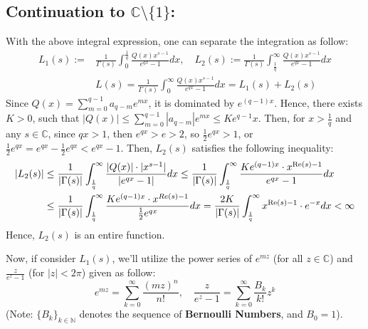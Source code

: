 \documentclass{article}
\newcommand{\NN}{\mathbb{N}}
\newcommand{\CC}{\mathbb{C}}
\newcommand{\Real}{\textmd{Re}}
\begin{document}
\subsection{Continuation to $\mathbb{C}\setminus\{1\}$:}
With the above integral expression, one can separate the integration as follow:
\begin{equation}
    \label{eq:6}
    \begin{split}
        L_1(s):=&\frac{1}{\Gamma(s)}\int_{0}^{\frac{1}{q}}\frac{Q(x)x^{s-1}}{e^{qx}-1}dx,\quad L_2(s):=\frac{1}{\Gamma(s)}\int_{\frac{1}{q}}^{\infty}\frac{Q(x)x^{s-1}}{e^{qx}-1}dx\\
        &L(s) = \frac{1}{\Gamma(s)}\int_{0}^{\infty}\frac{Q(x)x^{s-1}}{e^{qx}-1}dx = L_1(s)+L_2(s)
    \end{split}
\end{equation}
Since $Q(x)=\sum_{m=0}^{q-1}a_{q-m}e^{mx}$, it is dominated by $e^{(q-1)x}$. Hence, there exists $K>0$, such that $|Q(x)|\leq \sum_{m=0}^{q-1}|a_{q-m}|e^{mx}\leq Ke^{q-1}x$. Then, for $x>\frac{1}{q}$ and any $s\in\mathbb{C}$, since $qx >1$, then $e^{qx}>e>2$, so $\frac{1}{2}e^{qx}>1$, or $\frac{1}{2}e^{qx}=e^{qx}-\frac{1}{2}e^{qx}<e^{qx}-1$. Then, $L_2(s)$ satisfies the following inequality:
\begin{equation}
    \label{eq:7}
    \begin{split}
        |L_2(s)|&\leq \frac{1}{|\Gamma(s)|}\int_{\frac{1}{q}}^{\infty}\frac{|Q(x)|\cdot|x^{s-1}|}{|e^{qx}-1|}dx \leq \frac{1}{|\Gamma(s)|}\int_{\frac{1}{q}}^{\infty}\frac{Ke^{(q-1)x}\cdot x^{\textmd{Re}(s)-1}}{e^{qx}-1}dx\\
        &\leq \frac{1}{|\Gamma(s)|}\int_{\frac{1}{q}}^{\infty}\frac{Ke^{(q-1)x}\cdot x^{Re(s)-1}}{\frac{1}{2}e^{qx}}dx = \frac{2K}{|\Gamma(s)|}\int_{\frac{1}{q}}^{\infty}x^{\Real(s)-1}\cdot e^{-x}dx < \infty
    \end{split}
\end{equation}
Hence, $L_2(s)$ is an entire function.

Now, if consider $L_1(s)$, we'll utilize the power series of $e^{mz}$ (for all $z\in\CC$) and $\frac{z}{e^z-1}$ (for $|z|<2\pi$) given as follow:
\begin{equation}
    \label{eq:8}
    e^{mz} = \sum_{k=0}^{\infty}\frac{(mz)^n}{n!},\quad \frac{z}{e^z-1}=\sum_{k=0}^{\infty}\frac{B_k}{k!}z^k
\end{equation}
(Note: $\{B_k\}_{k\in\NN}$ denotes the sequence of \textbf{Bernoulli Numbers}, and $B_0=1$).
\end{document}

